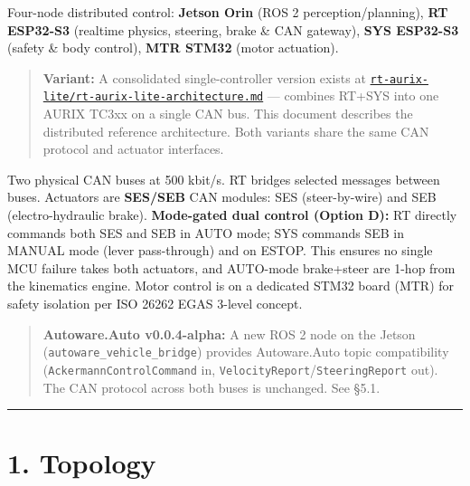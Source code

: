 \documentclass[12pt,a4paper,oneside]{report}
\begin{document}
Four-node distributed control: \textbf{Jetson Orin} (ROS 2 perception/planning),
\textbf{RT ESP32-S3} (realtime physics, steering, brake \& CAN gateway),
\textbf{SYS ESP32-S3} (safety \& body control), \textbf{MTR STM32} (motor
actuation).

\begin{quote}
\textbf{Variant:} A consolidated single-controller version exists at
\href{rt-aurix-lite/rt-aurix-lite-architecture.md}{\texttt{rt-aurix-lite/rt-aurix-lite-architecture.md}}
--- combines RT+SYS into one AURIX TC3xx on a single CAN bus. This document
describes the distributed reference architecture. Both variants share the same
CAN protocol and actuator interfaces.
\end{quote}

Two physical CAN buses at 500 kbit/s. RT bridges selected messages between
buses. Actuators are \textbf{SES/SEB} CAN modules: SES (steer-by-wire) and SEB
(electro-hydraulic brake). \textbf{Mode-gated dual control (Option D):} RT
directly commands both SES and SEB in AUTO mode; SYS commands SEB in MANUAL
mode (lever pass-through) and on ESTOP. This ensures no single MCU failure takes
both actuators, and AUTO-mode brake+steer are 1-hop from the kinematics engine.
Motor control is on a dedicated STM32 board (MTR) for safety isolation per ISO
26262 EGAS 3-level concept.

\begin{quote}
\textbf{Autoware.Auto v0.0.4-alpha:} A new ROS 2 node on the Jetson
(\texttt{autoware\_vehicle\_bridge}) provides Autoware.Auto topic compatibility
(\texttt{AckermannControlCommand} in,
\texttt{VelocityReport}/\texttt{SteeringReport} out). The CAN protocol across
both buses is unchanged. See §5.1.
\end{quote}

\begin{center}\rule{0.5\linewidth}{0.5pt}\end{center}

\section{1. Topology}\label{topology}
\end{document}
